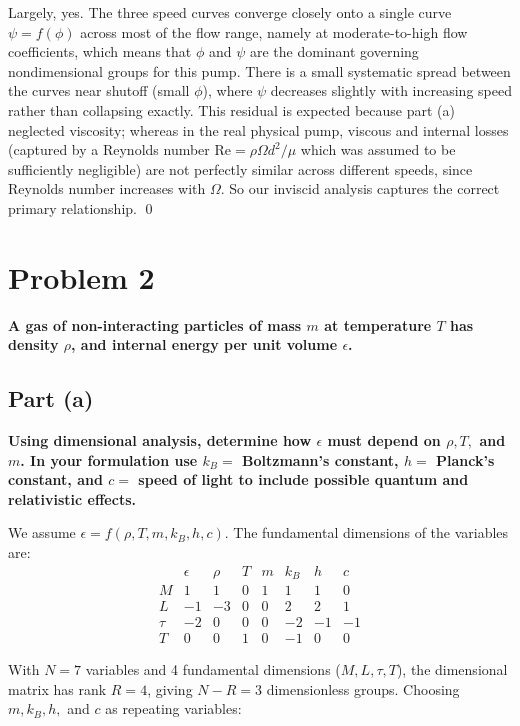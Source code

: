 \documentclass[12pt]{article}
\begin{document}
Largely, yes. The three speed curves converge closely onto a single curve 
$\psi = f(\phi)$ across most of the flow range, namely at moderate-to-high flow coefficients, 
which means that $\phi$ and $\psi$ are the dominant governing nondimensional groups for this 
pump. There is a small systematic spread between the curves near shutoff (small $\phi$), where 
$\psi$ decreases slightly with increasing speed rather than collapsing exactly. This residual is 
expected because part (a) neglected viscosity; whereas in the real physical pump, viscous and 
internal losses (captured by a Reynolds number $\text{Re} = \rho \Omega d^2/\mu$ which was 
assumed to be sufficiently negligible) are not perfectly similar across different speeds, since 
Reynolds number increases with $\Omega$. So our inviscid analysis captures the correct 
primary relationship. \qed

\newpage

\section*{Problem 2}
\textbf{A gas of non-interacting particles of mass $m$ at temperature $T$ has density $\rho$, and internal energy per unit volume $\epsilon$.}

\subsection*{Part (a)}
\textbf{Using dimensional analysis, determine how $\epsilon$ must depend on $\rho, T,$ and $m$. In your formulation use $k_B =$ Boltzmann's constant, $h =$ Planck's constant, and $c =$ speed of light to include possible quantum and relativistic effects.}

We assume $\epsilon = f(\rho, T, m, k_B, h, c)$. The fundamental dimensions of the variables are:
\begin{equation*}
    \begin{array}{c|ccccccc}
        & \epsilon & \rho & T & m & k_B & h & c \\
        \hline
        M & 1 & 1 & 0 & 1 & 1 & 1 & 0 \\
        L & -1 & -3 & 0 & 0 & 2 & 2 & 1 \\
        \tau & -2 & 0 & 0 & 0 & -2 & -1 & -1 \\
        T & 0 & 0 & 1 & 0 & -1 & 0 & 0
    \end{array}
\end{equation*}

With $N = 7$ variables and 4 fundamental dimensions ($M, L, \tau, T$), the dimensional matrix has rank $R = 4$, giving $N - R = 3$ dimensionless groups. Choosing $m, k_B, h,$ and $c$ as repeating variables:
\end{document}
